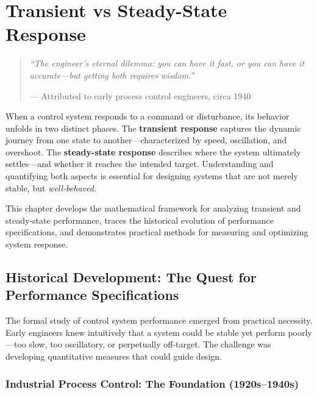 
\setcounter{chapter}{6}

\chapter{Transient vs Steady-State Response}

\begin{quote}
\textit{``The engineer's eternal dilemma: you can have it fast, or you can have it accurate---but getting both requires wisdom.''}
\vspace{0.5em}

--- Attributed to early process control engineers, circa 1940
\end{quote}

\vspace{1em}

\noindent
When a control system responds to a command or disturbance, its behavior unfolds in two distinct phases. The \textbf{transient response} captures the dynamic journey from one state to another---characterized by speed, oscillation, and overshoot. The \textbf{steady-state response} describes where the system ultimately settles---and whether it reaches the intended target. Understanding and quantifying both aspects is essential for designing systems that are not merely stable, but \textit{well-behaved}.

This chapter develops the mathematical framework for analyzing transient and steady-state performance, traces the historical evolution of performance specifications, and demonstrates practical methods for measuring and optimizing system response.

\section{Historical Development: The Quest for Performance Specifications}

The formal study of control system performance emerged from practical necessity. Early engineers knew intuitively that a system could be stable yet perform poorly---too slow, too oscillatory, or perpetually off-target. The challenge was developing quantitative measures that could guide design.

\subsection{Industrial Process Control: The Foundation (1920s--1940s)}

